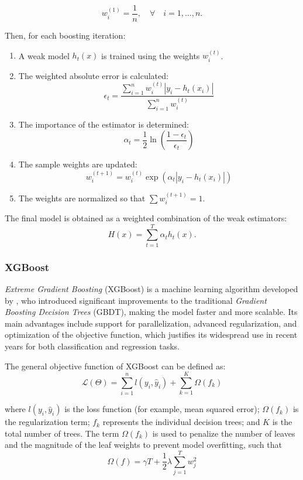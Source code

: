 \[
w_i^{(1)} = \frac{1}{n}, \quad \forall \quad i = 1, \dots, n.
\]

Then, for each boosting iteration:
\begin{enumerate}
    \item A weak model $h_t(x)$ is trained using the weights $w_i^{(t)}$.
    \item The weighted absolute error is calculated:
    \[
    \epsilon_t = \frac{\sum_{i=1}^{n} w_i^{(t)} |y_i - h_t(x_i)|}{\sum_{i=1}^{n} w_i^{(t)}}
    \]
    \item The importance of the estimator is determined:
    \[
    \alpha_t = \frac{1}{2} \ln \left( \frac{1 - \epsilon_t}{\epsilon_t} \right)
    \]
    \item The sample weights are updated:
    \[
    w_i^{(t+1)} = w_i^{(t)} \exp\left(\alpha_t |y_i - h_t(x_i)|\right)
    \]
    \item The weights are normalized so that $\sum w_i^{(t+1)} = 1$.
\end{enumerate}

The final model is obtained as a weighted combination of the weak estimators:
\[
H(x) = \sum_{t=1}^{T} \alpha_t h_t(x).
\]

\subsubsection{XGBoost}
\textit{Extreme Gradient Boosting} (XGBoost) is a machine learning algorithm developed by \cite{chen2016xgboost}, who introduced significant improvements to the traditional \textit{Gradient Boosting Decision Trees} (GBDT), making the model faster and more scalable. Its main advantages include support for parallelization, advanced regularization, and optimization of the objective function, which justifies its widespread use in recent years for both classification and regression tasks.

The general objective function of XGBoost can be defined as:
\begin{equation}
\mathcal{L}(\Theta) = \sum_{i=1}^{n} l(y_i, \hat{y}_i) + \sum_{k=1}^{K} \Omega(f_k)
\end{equation}

where $l(y_i, \hat{y}_i)$ is the loss function (for example, mean squared error); $\Omega(f_k)$ is the regularization term; $f_k$ represents the individual decision trees; and $K$ is the total number of trees. The term $\Omega(f_k)$ is used to penalize the number of leaves and the magnitude of the leaf weights to prevent model overfitting, such that
\begin{equation}
\Omega(f) = \gamma T + \frac{1}{2} \lambda \sum_{j=1}^{T} w_j^2
\end{equation}


